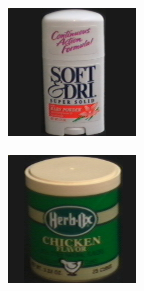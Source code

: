 \begin{figure}[htbp]
\begin{subfigure}{80pt}
    \caption{}
	\end{subfigure}
	\begin{subfigure}{80pt}
        \centering
    \includegraphics[width=\textwidth]{figures/coil_original/22.png}
    \caption{}
	\end{subfigure}
	\begin{subfigure}{80pt}
        \centering
    \includegraphics[width=\textwidth]{figures/coil_original/26.png}

\end{subfigure}
\end{figure}
